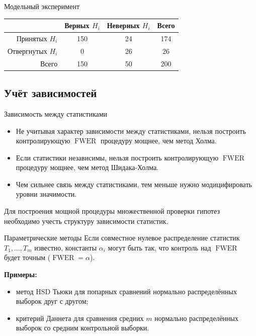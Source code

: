 \documentclass[9pt,pdf,utf8,hyperref={unicode},aspectratio=169]{beamer}
\DeclareMathOperator{\FWER}{FWER}
\begin{document}
\begin{frame}{Модельный эксперимент}
{    \begin{center}
        \begin{tabular}{ |r | c | c | c |}
        \hline
                          & Верных $H_i$ & Неверных $H_i$ & Всего \\ \hline
        Принятых $H_i$    & 150          & 24             & 174   \\ \hline
        Отвергнутых $H_i$ & 0            & 26             & 26    \\ \hline
        Всего             & 150          & 50             & 200   \\ \hline
        \end{tabular}
    \end{center}
    }
\end{frame}

\subsection{Учёт зависимостей}
\begin{frame}{Зависимость между статистиками}
    \begin{itemize}
    \item Не учитывая характер зависимости между статистиками, нельзя построить контролирующую $\FWER$ процедуру мощнее, чем метод Холма.
    \item Если статистики независимы, нельзя построить контролирующую $\FWER$ процедуру мощнее, чем метод Шидака-Холма.
    \item Чем сильнее связь между статистиками, тем меньше нужно модицифировать уровни значимости.
    \end{itemize}

    \bigskip

    Для построения мощной процедуры множественной проверки гипотез необходимо учесть структуру зависимости статистик.
\end{frame}



\begin{frame}{Параметрические методы}
    Если совместное нулевое распределение статистик $T_1,\ldots,T_m$ известно, константы $\alpha_i$ могут быть так, что контроль над $\FWER$ будет точным ($\FWER=\alpha$).

    \bigskip

    \textbf{Примеры:}
    \begin{itemize}
    \item метод HSD Тьюки для попарных сравнений нормально распределённых выборок друг с другом;
    \item критерий Даннета для сравнения средних $m$ нормально распределённых выборок со средним контрольной выборки.
    \end{itemize}
\end{frame}
\end{document}
